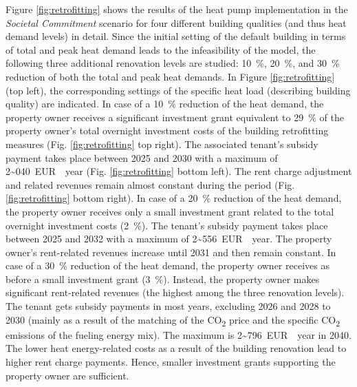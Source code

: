 Figure \ref{fig:retrofitting} shows the results of the heat pump implementation in the \textit{Societal Commitment} scenario for four different building qualities (and thus heat demand levels) in detail. Since the initial setting of the default building in terms of total and peak heat demand leads to the infeasibility of the model, the following three additional renovation levels are studied: \SI{10}{\%}, \SI{20}{\%}, and \SI{30}{\%} reduction of both the total and peak heat demands. In Figure \ref{fig:retrofitting} (top left), the corresponding settings of the specific heat load (describing building quality) are indicated. In case of a \SI{10}{\%} reduction of the heat demand, the property owner receives a significant investment grant equivalent to \SI{29}{\%} of the property owner's total overnight investment costs of the building retrofitting measures (Fig. \ref{fig:retrofitting} top right). The associated tenant's subsidy payment takes place between 2025 and 2030 with a maximum of \SI{2~040}{EUR \per year} (Fig. \ref{fig:retrofitting} bottom left). The rent charge adjustment and related revenues remain almost constant during the period (Fig. \ref{fig:retrofitting} bottom right). In case of a \SI{20}{\%} reduction of the heat demand, the property owner receives only a small investment grant related to the total overnight investment costs (\SI{2}{\%}). The tenant's subsidy payment takes place between 2025 and 2032 with a maximum of \SI{2~556}{EUR \per year}. The property owner's rent-related revenues increase until 2031 and then remain constant. In case of a \SI{30}{\%} reduction of the heat demand, the property owner receives as before a small investment grant (\SI{3}{\%}). Instead, the property owner makes significant rent-related revenues (the highest among the three renovation levels). The tenant gets subsidy payments in most years, excluding 2026 and 2028 to 2030 (mainly as a result of the matching of the CO\textsubscript{2} price and the specific CO\textsubscript{2} emissions of the fueling energy mix). The maximum is \SI{2~796}{EUR \per year} in 2040. The lower heat energy-related costs as a result of the building renovation lead to higher rent charge payments. Hence, smaller investment grants supporting the property owner are sufficient. 

